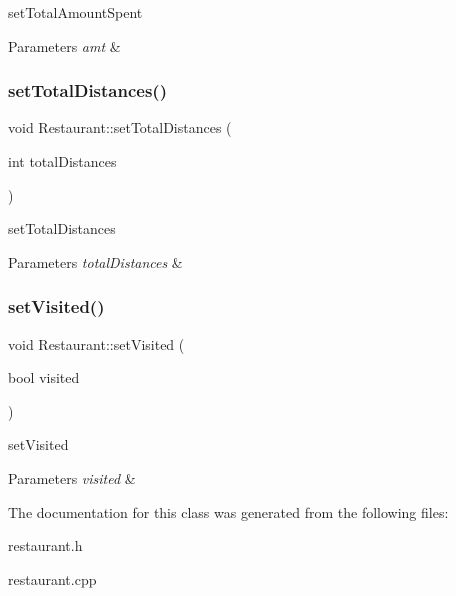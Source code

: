 set\+Total\+Amount\+Spent 


\begin{DoxyParams}{Parameters}
{\em amt} & \\
\hline
\end{DoxyParams}
\mbox{\label{class_restaurant_a014e06c350423b40fcfdac1bcbdd6ab1}} 
\subsubsection{\texorpdfstring{set\+Total\+Distances()}{setTotalDistances()}}
{\footnotesize\ttfamily void Restaurant\+::set\+Total\+Distances (\begin{DoxyParamCaption}\item[{int}]{total\+Distances }\end{DoxyParamCaption})}



set\+Total\+Distances 


\begin{DoxyParams}{Parameters}
{\em total\+Distances} & \\
\hline
\end{DoxyParams}
\mbox{\label{class_restaurant_a13b2e8a16f44e2fc4304e4b8689e1336}} 
\subsubsection{\texorpdfstring{set\+Visited()}{setVisited()}}
{\footnotesize\ttfamily void Restaurant\+::set\+Visited (\begin{DoxyParamCaption}\item[{bool}]{visited }\end{DoxyParamCaption})\hspace{0.3cm}{\ttfamily [inline]}}



set\+Visited 


\begin{DoxyParams}{Parameters}
{\em visited} & \\
\hline
\end{DoxyParams}


The documentation for this class was generated from the following files\+:\begin{DoxyCompactItemize}
\item 
restaurant.\+h\item 
restaurant.\+cpp\end{DoxyCompactItemize}
